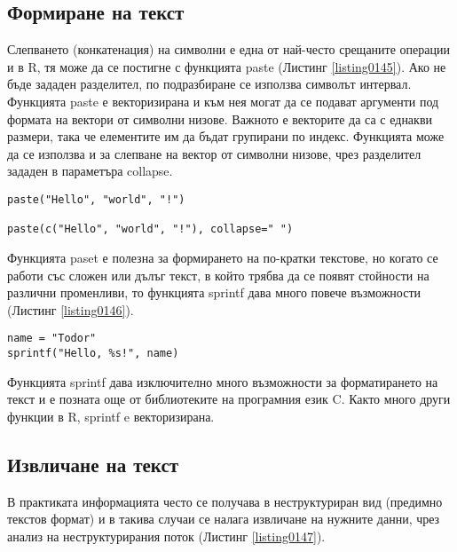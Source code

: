 \subsection{Формиране на текст}

Слепването (конкатенация) на символни е една от най-често срещаните операции и в R, тя може да се постигне с функцията paste (Листинг \ref{listing0145}). Ако не бъде зададен разделител, по подразбиране се използва символът интервал. Функцията paste е векторизирана и към нея могат да се подават аргументи под формата на вектори от символни низове. Важното е векторите да са с еднакви размери, така че елементите им да бъдат групирани по индекс. Функцията може да се използва и за слепване на вектор от символни низове, чрез разделител зададен в параметъра collapse.

\begin{lstlisting}[caption=Конкатенация на символни низове, label=listing0145]
paste("Hello", "world", "!")

paste(c("Hello", "world", "!"), collapse=" ")
\end{lstlisting}

Функцията paset е полезна за формирането на по-кратки текстове, но когато се работи със сложен или дълъг текст, в който трябва да се появят стойности на различни променливи, то функцията sprintf дава много повече възможности (Листинг \ref{listing0146}).

\begin{lstlisting}[caption=Разпъване от редове в колони, label=listing0146]
name = "Todor"
sprintf("Hello, %s!", name)
\end{lstlisting}

Функцията sprintf дава изключително много възможности за форматирането на текст и е позната още от библиотеките на програмния език C. Както много други функции в R, sprintf e векторизирана.

\subsection{Извличане на текст}

В практиката информацията често се получава в неструктуриран вид (предимно текстов формат) и в такива случаи се налага извличане на нужните данни, чрез анализ на неструктурирания поток (Листинг \ref{listing0147}).

